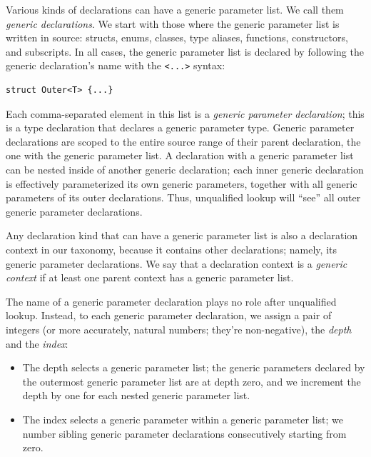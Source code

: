 \documentclass[../generics]{subfiles}
\begin{document}
Various kinds of declarations can have a generic parameter list. We call them \emph{generic declarations}. We start with those where the generic parameter list is written in source: structs, enums, classes, type aliases, functions, constructors, and subscripts. In all cases, the generic parameter list is declared by following the generic declaration's name with the \texttt{<...>} syntax:
\begin{Verbatim}
struct Outer<T> {...}
\end{Verbatim}
Each comma-separated element in this list is a \emph{generic parameter declaration}; this is a type declaration that declares a generic parameter type. Generic parameter declarations are scoped to the entire source range of their parent declaration, the one with the generic parameter list. A declaration with a generic parameter list can be nested inside of another generic declaration; each inner generic declaration is effectively parameterized its own generic parameters, together with all generic parameters of its outer declarations. Thus, unqualified lookup will ``see'' all outer generic parameter declarations.

Any declaration kind that can have a generic parameter list is also a declaration context in our taxonomy, because it contains other declarations; namely, its generic parameter declarations. We say that a declaration context is a \emph{generic context} if at least one parent context has a generic parameter list.

The name of a generic parameter declaration plays no role after unqualified lookup. Instead, to each generic parameter declaration, we assign a pair of integers (or more accurately, natural numbers; they're non-negative), the \emph{depth} and the \emph{index}:
\begin{itemize}
\item The depth selects a generic parameter list; the generic parameters declared by the outermost generic parameter list are at depth zero, and we increment the depth by one for each nested generic parameter list.
\item The index selects a generic parameter within a generic parameter list; we number sibling generic parameter declarations consecutively starting from zero.
\end{itemize}
\end{document}
